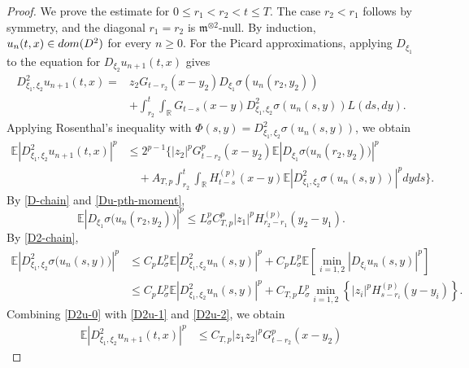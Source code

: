 \documentclass[10pt,a4paper]{amsart}
\def\bE{\mathbb{E}}
\def\bR{\mathbb{R}}
\newcommand{\fm}{\mathfrak{m}}
\begin{document}
\begin{proof}
We prove the estimate for $0\le r_1<r_2<t\le T$. The case
$r_2<r_1$ follows by symmetry, and the diagonal $r_1=r_2$ is
$\fm^{\otimes2}$-null. By induction, $u_n(t,x)\in{\rm dom}(D^2)$ for every
$n\ge0$.
For the Picard approximations, applying $D_{\xi_1}$ to the equation for
$D_{\xi_2}u_{n+1}(t,x)$ gives
\begin{align}
\label{D2u-picard-nonlinear}
D^2_{\xi_1,\xi_2}u_{n+1}(t,x)
=&
z_2G_{t-r_2}(x-y_2)
D_{\xi_1}\sigma(u_n(r_2,y_2))
\nonumber\\
&+
\int_{r_2}^t\int_{\bR}
G_{t-s}(x-y)
D^2_{\xi_1,\xi_2}\sigma(u_n(s,y))
L(ds,dy).
\end{align}
Applying Rosenthal's inequality with
$\Phi(s,y)=D^2_{\xi_1,\xi_2}\sigma(u_n(s,y))$, we obtain
\begin{equation}
    \label{D2u-0}
\begin{aligned}
 \bE\left|D^2_{\xi_1,\xi_2}u_{n+1}(t,x)\right|^p
&\le
2^{p-1}
\bigg\{
|z_2|^pG_{t-r_2}^p(x-y_2)
\bE\left|D_{\xi_1}\sigma\big(u_n(r_2,y_2)\big)\right|^p\\
&\quad+
A_{T,p}
\int_{r_2}^t\int_{\bR}
H_{t-s}^{(p)}(x-y)
\bE\left|
D^2_{\xi_1,\xi_2}\sigma(u_n(s,y))
\right|^p
dy ds
\bigg\}.
\end{aligned}
\end{equation}
By \eqref{D-chain} and 
 \eqref{Du-pth-moment},
\begin{equation}
    \label{D2u-1}
\bE\left|D_{\xi_1}\sigma\big(u_n(r_2,y_2)\big)\right|^p\le
L_\sigma^p C_{T,p}^p
|z_1|^p
H_{r_2-r_1}^{(p)}(y_2-y_1). 
\end{equation}
By \eqref{D2-chain},
\begin{equation}
\label{D2u-2}
\begin{aligned}
\bE\left|D^2_{\xi_1,\xi_2}\sigma\big(u_n(s,y)\big)\right|^p
&\le
C_pL_\sigma^p
\bE\left|D^2_{\xi_1,\xi_2}u_n(s,y)\right|^p
+
C_pL_\sigma^p
\bE\left[
\min_{i=1,2}
\left|D_{\xi_i}u_n(s,y)\right|^p
\right]  \\
&\le
C_pL_\sigma^p
\bE\left|D^2_{\xi_1,\xi_2}u_n(s,y)\right|^p
+
C_{T,p}L_\sigma^p
\min_{i=1,2}
\left\{
|z_i|^pH_{s-r_i}^{(p)}(y-y_i)
\right\}.
\end{aligned}
\end{equation}
Combining \eqref{D2u-0} with \eqref{D2u-1} and \eqref{D2u-2}, we obtain
\begin{equation}
\label{D2-renewal-nonlinear}
\begin{aligned}
\bE\left|D^2_{\xi_1,\xi_2}u_{n+1}(t,x)\right|^p
&\le
C_{T,p}|z_1z_2|^p
G_{t-r_2}^p(x-y_2)

\end{aligned}
\end{equation}
\end{proof}
\end{document}

